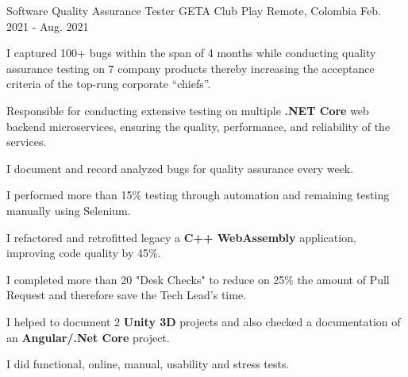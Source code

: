 \begin{cventries}
  \cventry
  {Software Quality Assurance Tester} %
  {GETA Club Play} %
  {Remote, Colombia} %
  {Feb. 2021 - Aug. 2021} %
  {
    \begin{cvitems} %
      \item {I captured 100+ bugs within the span of 4 months while conducting quality assurance
                  testing on 7 company products thereby increasing the acceptance criteria of the top-rung
                  corporate “chiefs”.}
      \item {Responsible for conducting extensive testing on multiple \textbf{.NET Core} web backend microservices, ensuring the quality, performance, and reliability of the services.}
      \item {I document and record analyzed bugs for quality assurance every week.}
      \item {I performed more than 15\% testing through automation and remaining testing manually
                  using Selenium.}
      \item {I refactored and retrofitted legacy a \textbf{C++ WebAssembly} application, improving code
                  quality by 45\%.}
      \item {I completed more than 20 "Desk Checks" to reduce on 25\% the amount of Pull Request
                  and therefore save the Tech Lead's time.}
      \item {I helped to document 2 \textbf{Unity 3D} projects and also checked a documentation of an
                  \textbf{Angular/.Net Core} project.}
      \item {I did functional, online, manual, usability and stress tests.}
    \end{cvitems}
  }
\end{cventries}
